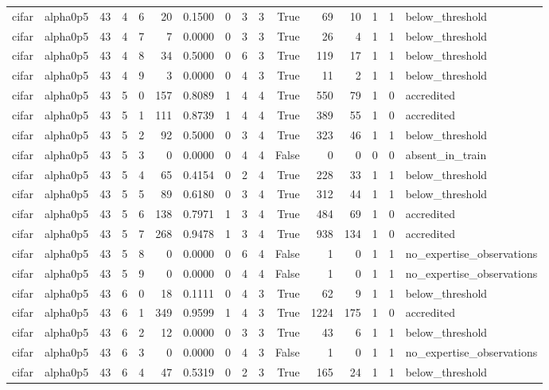 \begin{tabular}{llrrrrrrrrrrrrrl}
cifar & alpha0p5 & 43 & 4 & 6 & 20 & 0.1500 & 0 & 3 & 3 & True & 69 & 10 & 1 & 1 & below\_threshold \\
cifar & alpha0p5 & 43 & 4 & 7 & 7 & 0.0000 & 0 & 3 & 3 & True & 26 & 4 & 1 & 1 & below\_threshold \\
cifar & alpha0p5 & 43 & 4 & 8 & 34 & 0.5000 & 0 & 6 & 3 & True & 119 & 17 & 1 & 1 & below\_threshold \\
cifar & alpha0p5 & 43 & 4 & 9 & 3 & 0.0000 & 0 & 4 & 3 & True & 11 & 2 & 1 & 1 & below\_threshold \\
cifar & alpha0p5 & 43 & 5 & 0 & 157 & 0.8089 & 1 & 4 & 4 & True & 550 & 79 & 1 & 0 & accredited \\
cifar & alpha0p5 & 43 & 5 & 1 & 111 & 0.8739 & 1 & 4 & 4 & True & 389 & 55 & 1 & 0 & accredited \\
cifar & alpha0p5 & 43 & 5 & 2 & 92 & 0.5000 & 0 & 3 & 4 & True & 323 & 46 & 1 & 1 & below\_threshold \\
cifar & alpha0p5 & 43 & 5 & 3 & 0 & 0.0000 & 0 & 4 & 4 & False & 0 & 0 & 0 & 0 & absent\_in\_train \\
cifar & alpha0p5 & 43 & 5 & 4 & 65 & 0.4154 & 0 & 2 & 4 & True & 228 & 33 & 1 & 1 & below\_threshold \\
cifar & alpha0p5 & 43 & 5 & 5 & 89 & 0.6180 & 0 & 3 & 4 & True & 312 & 44 & 1 & 1 & below\_threshold \\
cifar & alpha0p5 & 43 & 5 & 6 & 138 & 0.7971 & 1 & 3 & 4 & True & 484 & 69 & 1 & 0 & accredited \\
cifar & alpha0p5 & 43 & 5 & 7 & 268 & 0.9478 & 1 & 3 & 4 & True & 938 & 134 & 1 & 0 & accredited \\
cifar & alpha0p5 & 43 & 5 & 8 & 0 & 0.0000 & 0 & 6 & 4 & False & 1 & 0 & 1 & 1 & no\_expertise\_observations \\
cifar & alpha0p5 & 43 & 5 & 9 & 0 & 0.0000 & 0 & 4 & 4 & False & 1 & 0 & 1 & 1 & no\_expertise\_observations \\
cifar & alpha0p5 & 43 & 6 & 0 & 18 & 0.1111 & 0 & 4 & 3 & True & 62 & 9 & 1 & 1 & below\_threshold \\
cifar & alpha0p5 & 43 & 6 & 1 & 349 & 0.9599 & 1 & 4 & 3 & True & 1224 & 175 & 1 & 0 & accredited \\
cifar & alpha0p5 & 43 & 6 & 2 & 12 & 0.0000 & 0 & 3 & 3 & True & 43 & 6 & 1 & 1 & below\_threshold \\
cifar & alpha0p5 & 43 & 6 & 3 & 0 & 0.0000 & 0 & 4 & 3 & False & 1 & 0 & 1 & 1 & no\_expertise\_observations \\
cifar & alpha0p5 & 43 & 6 & 4 & 47 & 0.5319 & 0 & 2 & 3 & True & 165 & 24 & 1 & 1 & below\_threshold \\

\end{tabular}
